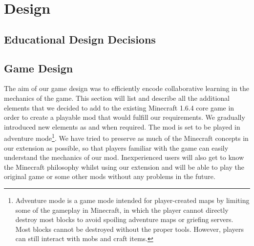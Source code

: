 \chapter{Design}
\label{ch:design}

\section{Educational Design Decisions}

\section{Game Design}
The aim of our game design was to efficiently encode collaborative learning in the mechanics of the game. This section will list and describe all the additional elements that we decided to add to the existing Minecraft 1.6.4 core game in order to create a playable mod that would fulfill our requirements. We gradually introduced new elements as and when required.
\newline\newline
The mod is set to be played in adventure mode\footnote{Adventure mode is a game mode intended for player-created maps by limiting some of the gameplay in Minecraft, in which the player cannot directly destroy most blocks to avoid spoiling adventure maps or griefing servers. Most blocks cannot be destroyed without the proper tools. However, players can still interact with mobs and craft items.\cite{website:minecraft-adventure}}.
We have tried to preserve as much of the Minecraft concepts in our extension as possible, so that players familiar with the game can easily understand the mechanics of our mod. Inexperienced users will also get to know the Minecraft philosophy whilst using our extension and will be able to play the original game or some other mods without any problems in the future.

